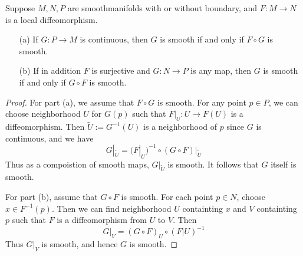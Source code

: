 \begin{proposition}\label{smooth iff composition smooth}
Suppose $M,N,P$ are smoothmanifolds with or without boundary, and $F:M\to N$ is a local diffeomorphism.
\begin{itemize}
\item[(a)]If $G:P\to M$ is continuous, then $G$ is smooth if and only if $F\circ G$ is smooth.
\item[(b)]If in addition $F$ is surjective and $G:N\to P$ is any map, then $G$ is smooth if and only if $G\circ F$ is smooth.
\end{itemize}
\begin{proof}
For part (a), we assume that $F\circ G$ is smooth. For any point $p\in P$, we can choose neighborhood $U$ for $G(p)$ such that $F|_U:U\to F(U)$ is a diffeomorphism. Then $\widetilde{U}:=G^{-1}(U)$ is a neighborhood of $p$ since $G$ is continuous, and we have
\[G|_{\widetilde{U}}=(F|_{U})^{-1}\circ (G\circ F)|_{\widetilde{U}}\]
Thus as a compoistion of smooth maps, $G|_{\widetilde{U}}$ is smooth. It follows that $G$ itself is smooth.\par
For part (b), assume that $G\circ F$ is smooth. For each point $p\in N$, choose $x\in F^{-1}(p)$. Then we can find neighborhood $U$ containting $x$ and $V$ containting $p$ such that $F$ is a diffeomorphism from $U$ to $V$. Then
\[G|_V=(G\circ F)_U\circ(F|U)^{-1}\]
Thus $G|_V$ is smooth, and hence $G$ is smooth.
\end{proof}
\end{proposition}
